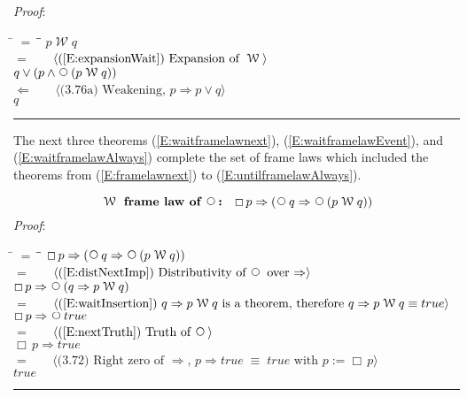 \documentclass[12pt, fleqn, leqno]{article}
\newcommand{\lgap}{2pt}                             %
\newcommand{\mymathindent}{24pt}                    %
\newcommand{\equivs}{\ensuremath{\;\equiv\;}}       %
\newcommand{\impl}{\ensuremath{\Rightarrow}}        %
\newcommand{\foll}{\ensuremath{\Leftarrow}}         %
\newcommand{\Wait}{\;\mathcal{W}\;}
\newcommand{\Next}{\;\,\text{\raisebox{3.5pt}{\circle{6}}}}
\newcommand{\Always}{\Box\,}
\newcommand{\myqed}{\rule[-.23ex]{1.2ex}{2.0ex}}
\newcommand{\myqedtab}{\hspace{384pt}}              %
\newcommand{\Gll} {\langle}                         %
\newcommand{\Ggg} {\rangle}                         %
\newcommand{\Hint}[1]     {\ \ \ $\Gll              \mbox{#1} \Ggg$ }   %
\begin{document}
\emph{Proof}:
\begin{tabbing}
\hspace{\mymathindent} \= $= \;$ \= \myqedtab \= \kill
\> \> $p \Wait q$\\[\lgap]
\> $=$ \> \Hint{(\ref{E:expansionWait}) Expansion of $\Wait$} \\[\lgap]
\> \> $q \lor (p \land \Next(p \Wait q))$\\[\lgap]
\> $\foll$ \> \Hint{(3.76a) Weakening, $p\impl p\lor q$} \\[\lgap]
\> \> $q$ \quad \myqed
\end{tabbing}

The next three theorems 
(\ref{E:waitframelawnext}),
(\ref{E:waitframelawEvent}),
and
(\ref{E:waitframelawAlways})
complete the set of frame laws which included the theorems from (\ref{E:framelawnext}) to (\ref{E:untilframelawAlways}).

\begin{equation}\label{E:waitframelawnext}
\textbf{$\Wait$ frame law of $\Next$:}\quad \Always p \impl (\Next q \impl \Next (p \Wait q))
\end{equation}
\emph{Proof}:
\begin{tabbing}
\hspace{\mymathindent} \= $= \;$ \= \myqedtab \= \kill
	\> \>   $\Always p \impl (\Next q \impl \Next (p \Wait q))$\\[\lgap]
	\> $=$  \>  \Hint{(\ref{E:distNextImp}) Distributivity of $\Next$ over $\impl$}\\[\lgap]
	\> \>   $\Always p \impl \Next (q \impl p \Wait q)$\\[\lgap]
	\> $=$  \>  \Hint{(\ref{E:waitInsertion}) $q \impl p \Wait q$ is a theorem, therefore $q \impl p \Wait q \equiv true$}\\[\lgap]
	\> \>   $\Always p \impl \Next true$\\[\lgap]
	\> $=$  \>  \Hint{(\ref{E:nextTruth}) Truth of $\Next$}\\[\lgap]
	\> \>   $\Always p \impl true$\\[\lgap]
	\> $=$  \>  \Hint{(3.72) Right zero of $\impl$, $p\impl true \equivs true$ with $p := \Always p$}\\[\lgap]
	\> \>   $true$ \quad \myqed
\end{tabbing}
\end{document}

